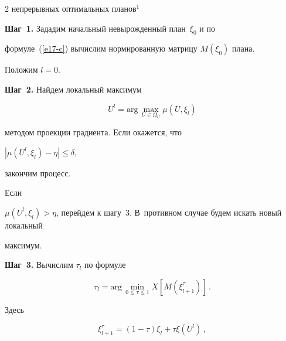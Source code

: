 \begin{multicols}{2}
{непрерывных оптимальных планов$^1$}





\renewcommand{\thefootnote}{\arabic{footnote}}







\smallskip\textbf{Шаг~1.} Зададим начальный невырожденный план~$\xi_0$ и по


формуле~(\ref{e17-c}) вычислим нормированную матрицу $M(\xi_0)$ плана.


Положим $l=0$.





\smallskip\textbf{Шаг~2.} Найдем локальный максимум


  $$


  U^l=\mathrm{arg}\,\max_{U\in \Omega_U} \mu\left ( U,\xi_l\right)


  $$


методом проекции градиента. Если окажется, что


$\left\vert \mu\left( U^l,\xi_l\right)-\eta\right\vert \leq\delta$,


закончим процесс.


  Если


$


  \mu\left( U^l,\xi_l\right)>\eta$, перейдем к шагу~3. В~противном случае будем искать новый локальный


максимум.





\smallskip\textbf{Шаг~3.} Вычислим $\tau_l$ по формуле


  \begin{equation*}


  \tau_l =\mathrm{arg}\,\min_{0\leq \tau\leq 1} X\left[


M\left(\xi^\tau_{l+1}\right)\right]\,.


\end{equation*}


Здесь


\begin{equation*}


  \xi^\tau_{l+1} =\left(1-\tau\right)\xi_l+\tau\xi\left(U^l\right)\,,



\end{equation*}
\end{multicols}
